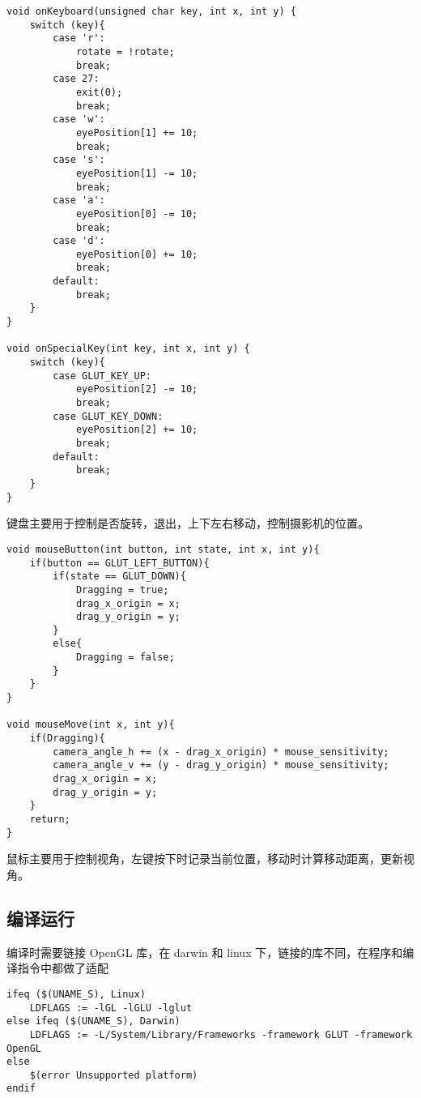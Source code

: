 \documentclass[12pt,hyperref,a4paper,UTF8]{ctexart}
\begin{document}
\begin{verbatim}
void onKeyboard(unsigned char key, int x, int y) {
    switch (key){
        case 'r':
            rotate = !rotate;
            break;
        case 27:
            exit(0);
            break;
        case 'w':
            eyePosition[1] += 10;
            break;
        case 's':
            eyePosition[1] -= 10;
            break;
        case 'a':
            eyePosition[0] -= 10;
            break;
        case 'd':
            eyePosition[0] += 10;
            break;
        default:
            break;
    }
}

void onSpecialKey(int key, int x, int y) {
    switch (key){
        case GLUT_KEY_UP:
            eyePosition[2] -= 10;
            break;
        case GLUT_KEY_DOWN:
            eyePosition[2] += 10;
            break;
        default:
            break;
    }
}
\end{verbatim}

键盘主要用于控制是否旋转，退出，上下左右移动，控制摄影机的位置。

\begin{verbatim}
void mouseButton(int button, int state, int x, int y){
    if(button == GLUT_LEFT_BUTTON){
        if(state == GLUT_DOWN){
            Dragging = true;
            drag_x_origin = x;
            drag_y_origin = y;
        }
        else{
            Dragging = false;
        }
    }
}

void mouseMove(int x, int y){
    if(Dragging){
        camera_angle_h += (x - drag_x_origin) * mouse_sensitivity;
        camera_angle_v += (y - drag_y_origin) * mouse_sensitivity;
        drag_x_origin = x;
        drag_y_origin = y;
    }
    return;
}
\end{verbatim}

鼠标主要用于控制视角，左键按下时记录当前位置，移动时计算移动距离，更新视角。

\subsection{编译运行}
编译时需要链接 OpenGL 库，在 darwin 和 linux 下，链接的库不同，在程序和编译指令中都做了适配

\begin{verbatim}
ifeq ($(UNAME_S), Linux)
	LDFLAGS := -lGL -lGLU -lglut
else ifeq ($(UNAME_S), Darwin)
	LDFLAGS := -L/System/Library/Frameworks -framework GLUT -framework OpenGL
else
    $(error Unsupported platform)
endif
\end{verbatim}
\end{document}
